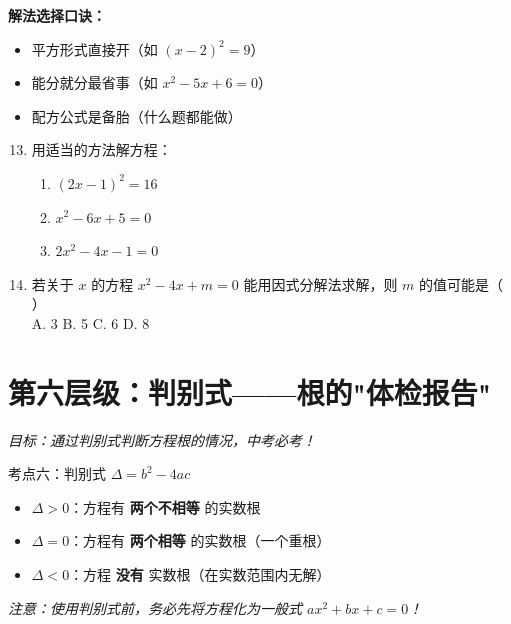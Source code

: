 \documentclass[12pt, a4paper]{article}
\begin{document}
\begin{tipbox}
    \textbf{解法选择口诀：}
    \begin{itemize}
        \item 平方形式直接开（如 $(x-2)^2 = 9$）
        \item 能分就分最省事（如 $x^2 - 5x + 6 = 0$）
        \item 配方公式是备胎（什么题都能做）
    \end{itemize}
\end{tipbox}

\begin{examplebox}
    \begin{enumerate}[label=\textbf{例\arabic*.}]
        \setcounter{enumi}{12}
        \item 用适当的方法解方程：
        \begin{enumerate}
            \item[(1)] $(2x-1)^2 = 16$
            \item[(2)] $x^2 - 6x + 5 = 0$
            \item[(3)] $2x^2 - 4x - 1 = 0$
        \end{enumerate}
        
        \item 若关于 $x$ 的方程 $x^2 - 4x + m = 0$ 能用因式分解法求解，则 $m$ 的值可能是（ \quad ）\\
        A. 3 \quad B. 5 \quad C. 6 \quad D. 8
    \end{enumerate}
\end{examplebox}

\begin{answerblank}[第13-14题]
    \vspace{6cm}
\end{answerblank}

\newpage

\section{第六层级：判别式——根的"体检报告"}
\textit{目标：通过判别式判断方程根的情况，中考必考！}

\begin{conceptbox}{考点六：判别式 $\Delta = b^2 - 4ac$}
    \begin{itemize}
        \item $\Delta > 0$：方程有 \textbf{两个不相等} 的实数根
        \item $\Delta = 0$：方程有 \textbf{两个相等} 的实数根（一个重根）
        \item $\Delta < 0$：方程 \textbf{没有} 实数根（在实数范围内无解）
    \end{itemize}
    \textit{注意：使用判别式前，务必先将方程化为一般式 $ax^2 + bx + c = 0$！}
\end{conceptbox}
\end{document}
